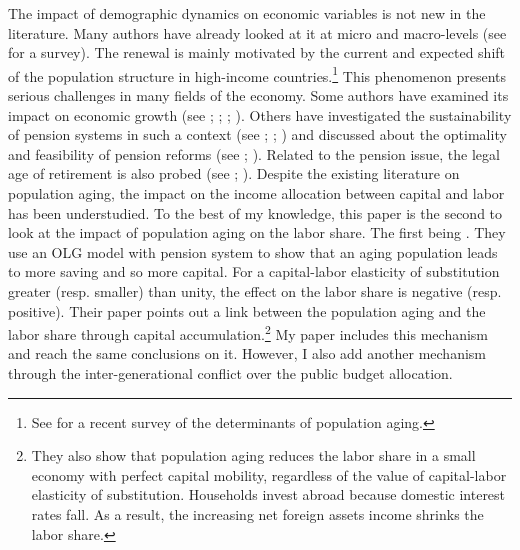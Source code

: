 The impact of demographic dynamics on economic variables is not new in the literature. Many authors have already looked at it at micro and macro-levels (see \citealt{Clark1978} for a survey). The renewal is mainly motivated by the current and expected shift of the population structure in high-income countries.\footnote{See \cite{Bloom2016} for a recent survey of the determinants of population aging.} This phenomenon presents serious challenges in many fields of the economy. Some authors have examined its impact on economic growth (see \citealt{VanGroezen2005}; \citealt{Soares2005}; \citealt{Bloom2010}; \citealt{Lee2010}). Others have investigated the sustainability of pension systems in such a context (see \citealt{Ono2003}; \citealt{DelaCroix2013}; \citealt{Philipov2014}) and discussed about the optimality and feasibility of pension reforms (see \citealt{Pecchenino1997}; \citealt{Sinn2003}). Related to the pension issue, the legal age of retirement is also probed (see \citealt{Futagami2001}; \citealt{Dedry2017}). Despite the existing literature on population aging, the impact on the income allocation between capital and labor has been understudied. To the best of my knowledge, this paper is the second to look at the impact of population aging on the labor share. The first being \cite{Schmidt2013}. They use an OLG model with pension system to show that an aging population leads to more saving and so more capital. For a capital-labor elasticity of substitution greater (resp. smaller) than unity, the effect on the labor share is negative (resp. positive). Their paper points out a link between the population aging and the labor share through capital accumulation.\footnote{They also show that population aging reduces the labor share in a small economy with perfect capital mobility, regardless of the value of capital-labor elasticity of substitution. Households invest abroad because domestic interest rates fall. As a result, the increasing net foreign assets income shrinks the labor share.} My paper includes this mechanism and reach the same conclusions on it. However, I also add another mechanism through the inter-generational conflict over the public budget allocation.



